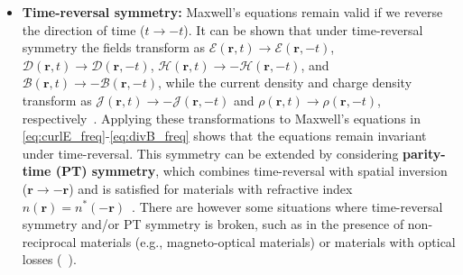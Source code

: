\begin{itemize}
        \item \textbf{Time-reversal symmetry:} Maxwell's equations remain valid if
              we reverse the direction of time ($t\to-t$). It can be shown that under
              time-reversal symmetry
              the fields transform as
              $\bm{\mathcal{E}}(\mathbf{r}, t)\to\bm{\mathcal{E}}(\mathbf{r}, -t)$,
              $\bm{\mathcal{D}}(\mathbf{r}, t)\to\bm{\mathcal{D}}(\mathbf{r}, -t)$,
              $\bm{\mathcal{H}}(\mathbf{r},
                  t)\to-\bm{\mathcal{H}}(\mathbf{r}, -t)$, and $\bm{\mathcal{B}}(\mathbf{r},
                  t)\to-\bm{\mathcal{B}}(\mathbf{r}, -t)$, while the current density and charge
              density transform as
              $\bm{\mathcal{J}}(\mathbf{r},
                  t)\to-\bm{\mathcal{J}}(\mathbf{r}, -t)$ and $\bm{\mathcal{\rho}}(\mathbf{r},
                  t)\to\bm{\mathcal{\rho}}(\mathbf{r}, -t)$, respectively~\cite{reciprocity}.
              Applying these transformations
              to Maxwell's equations in \eqref{eq:curlE_freq}-\eqref{eq:divB_freq} shows
              that the equations remain invariant under time-reversal. This
              symmetry can be extended by
              considering \textbf{parity-time (PT) symmetry}, which combines time-reversal
              with spatial inversion ($\mathbf{r}\to-\mathbf{r}$) and is satisfied for
              materials with refractive index $n(\mathbf{r}) = n^*(-\mathbf{r})$~\cite{pt}. There
              are however some situations where time-reversal symmetry and/or PT symmetry is
              broken,
              such as in the presence of
              non-reciprocal materials (e.g., magneto-optical materials) or materials with
              optical losses (~\cite{ownpub0}).


\end{itemize}
